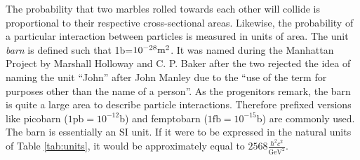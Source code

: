 The probability that two marbles rolled towards each other will collide is proportional to their respective cross-sectional areas.
Likewise, the probability of a particular interaction between particles is measured in units of area.
The unit \emph{barn} is defined such that 1b=$10^{-28}\text m^2$.
It was named during the Manhattan Project by Marshall Holloway and C. P. Baker after the two rejected the idea of naming the unit ``John'' after John Manley due to the ``use of the term for purposes other than the name of a person''. \cite{holloway}
As the progenitors remark, the barn is quite a large area to describe particle interactions. 
Therefore prefixed versions like picobarn ($1\text{pb}=10^{-12}$b) and femptobarn ($1\text{fb}=10^{-15}$b) are commonly used.
The barn is essentially an SI unit. If it were to be expressed in the natural units of Table \ref{tab:units}, it would be approximately equal to $2568\frac{\hbar^2 c^2}{\text{GeV}^2}$.
